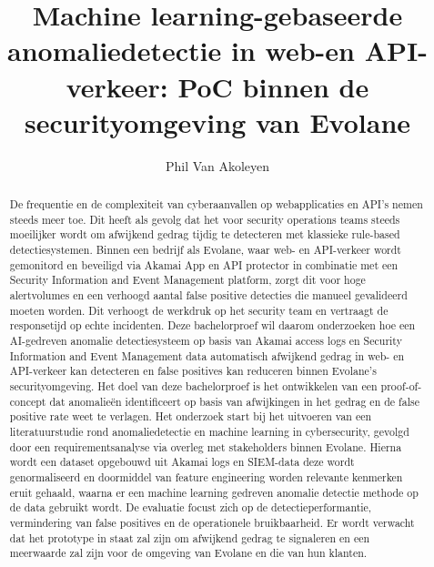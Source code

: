 \documentclass{hogent-article}
\title{Machine learning-gebaseerde anomaliedetectie in web-en API-verkeer: PoC binnen de securityomgeving van Evolane}
\author{Phil Van Akoleyen}
\begin{document}
\begin{abstract}
  De frequentie en de complexiteit van cyberaanvallen op webapplicaties en API’s nemen steeds meer toe. Dit heeft als gevolg dat het voor security operations teams steeds moeilijker wordt om afwijkend gedrag tijdig te detecteren met klassieke rule-based detectiesystemen. Binnen een bedrijf als Evolane, waar web- en API-verkeer wordt gemonitord en beveiligd via Akamai App en API protector in combinatie met een Security Information and Event Management platform, zorgt dit voor hoge alertvolumes en een verhoogd aantal false positive detecties die manueel gevalideerd moeten worden. Dit verhoogt de werkdruk op het security team en vertraagt de responsetijd op echte incidenten. Deze bachelorproef wil daarom onderzoeken hoe een AI-gedreven anomalie detectiesysteem op basis van Akamai access logs en Security Information and Event Management data automatisch afwijkend gedrag in web- en API-verkeer kan detecteren en false positives kan reduceren binnen Evolane’s securityomgeving. Het doel van deze bachelorproef is het ontwikkelen van een proof-of-concept dat anomalieën identificeert op basis van afwijkingen in het gedrag en de false positive rate weet te verlagen. Het onderzoek start bij het uitvoeren van een literatuurstudie rond anomaliedetectie en machine learning in cybersecurity, gevolgd door een requirementsanalyse via overleg met stakeholders binnen Evolane. Hierna wordt een dataset opgebouwd uit Akamai logs en SIEM-data deze wordt genormaliseerd en doormiddel van feature engineering worden relevante kenmerken eruit gehaald, waarna er een machine learning gedreven anomalie detectie methode op de data gebruikt wordt. De evaluatie focust zich op de detectieperformantie, vermindering van false positives en de operationele bruikbaarheid. Er wordt verwacht dat het prototype in staat zal zijn om afwijkend gedrag te signaleren en een meerwaarde zal zijn voor de omgeving van Evolane en die van hun klanten.
\end{abstract}

\tableofcontents



\printbibliography[heading=bibintoc]
\end{document}
